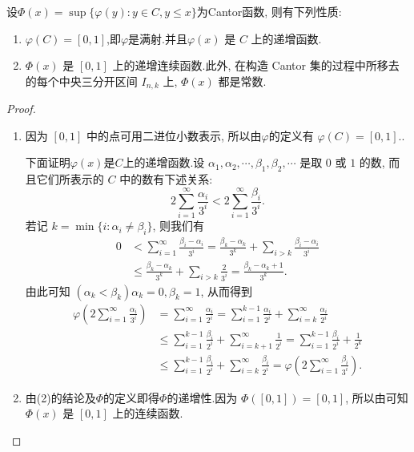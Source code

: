\documentclass[../../main.tex]{subfiles}
\begin{document}
\begin{theorem}[Cantor函数的性质]\label{theorem:Cantor函数的性质}
设$\varPhi(x)=\sup\{\varphi(y):y\in C,y\leqslant x\}$为Cantor函数, 则有下列性质:
\begin{enumerate}[(1)]
\item \(\varphi(C)=[0,1]\),即$\varphi$是满射.并且\(\varphi(x)\) 是 \(C\) 上的递增函数.

\item \(\varPhi(x)\) 是 \([0,1]\) 上的递增连续函数.此外, 在构造 Cantor 集的过程中所移去的每个中央三分开区间 \(I_{n,k}\) 上, \(\varPhi(x)\) 都是常数. 
\end{enumerate}
\end{theorem}
\begin{proof}
\begin{enumerate}[(1)]
\item 因为 \([0,1]\) 中的点可用二进位小数表示, 所以由$\varphi$的定义有 \(\varphi(C)=[0,1]\)..

下面证明$\varphi(x)$是$C$上的递增函数.设 \(\alpha_1,\alpha_2,\cdots,\beta_1,\beta_2,\cdots\) 是取 \(0\) 或 \(1\) 的数, 而且它们所表示的 \(C\) 中的数有下述关系:
\[
2\sum_{i = 1}^{\infty}\frac{\alpha_i}{3^i}<2\sum_{i = 1}^{\infty}\frac{\beta_i}{3^i}.
\]
若记 \(k = \min\{i:\alpha_i\neq\beta_i\}\), 则我们有
\begin{align*}
0&<\sum_{i = 1}^{\infty}\frac{\beta_i - \alpha_i}{3^i}=\frac{\beta_k - \alpha_k}{3^k}+\sum_{i > k}\frac{\beta_i - \alpha_i}{3^i}\\
&\leqslant\frac{\beta_k - \alpha_k}{3^k}+\sum_{i > k}\frac{2}{3^i}=\frac{\beta_k - \alpha_k + 1}{3^k}.
\end{align*}
由此可知 \((\alpha_k<\beta_k)\alpha_k = 0,\beta_k = 1\), 从而得到
\begin{align*}
\varphi\left(2\sum_{i = 1}^{\infty}\frac{\alpha_i}{3^i}\right)&=\sum_{i = 1}^{\infty}\frac{\alpha_i}{2^i}=\sum_{i = 1}^{k - 1}\frac{\alpha_i}{2^i}+\sum_{i = k}^{\infty}\frac{\alpha_i}{2^i}\\
&\leqslant\sum_{i = 1}^{k - 1}\frac{\beta_i}{2^i}+\sum_{i = k + 1}^{\infty}\frac{1}{2^i}=\sum_{i = 1}^{k - 1}\frac{\beta_i}{2^i}+\frac{1}{2^k}\\
&\leqslant\sum_{i = 1}^{k - 1}\frac{\beta_i}{2^i}+\sum_{i = k}^{\infty}\frac{\beta_i}{2^i}=\varphi\left(2\sum_{i = 1}^{\infty}\frac{\beta_i}{3^i}\right).
\end{align*}

\item 由(2)的结论及$\varPhi$的定义即得$\varPhi$的递增性.因为 \(\varPhi([0,1]) = [0,1]\), 所以由可知\(\varPhi(x)\) 是 \([0,1]\) 上的连续函数. 
\end{enumerate}

\end{proof}
\end{document}
